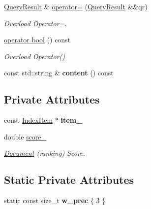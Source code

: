 \begin{DoxyCompactItemize}
\hyperlink{class_query_result}{Query\+Result} \& \hyperlink{class_query_result_a61fe09a36b729072cf8db7d36fbd57ba}{operator=} (\hyperlink{class_query_result}{Query\+Result} \&\&qr)
\begin{DoxyCompactList}\small\item\em Overload Operator=. \end{DoxyCompactList}\item 
\hyperlink{class_query_result_a7802d975b87856e0c213575258e0f4c0}{operator bool} () const
\begin{DoxyCompactList}\small\item\em Overload Operator() \end{DoxyCompactList}\item 
\mbox{\label{class_query_result_a043c7ad1c59640188e0e713fa548e560}} 
const std\+::string \& {\bfseries content} () const
\end{DoxyCompactItemize}
\subsection*{Private Attributes}
\begin{DoxyCompactItemize}
\item 
\mbox{\label{class_query_result_af34df0a7a6ae86b5eba712e3be297da3}} 
const \hyperlink{class_index_item}{Index\+Item} $\ast$ {\bfseries item\+\_\+}
\item 
\mbox{\label{class_query_result_abc28ed6816fe64438a1c4a9dcc3d802d}} 
double \hyperlink{class_query_result_abc28ed6816fe64438a1c4a9dcc3d802d}{score\+\_\+}
\begin{DoxyCompactList}\small\item\em \hyperlink{class_document}{Document} (ranking) Score. \end{DoxyCompactList}\end{DoxyCompactItemize}
\subsection*{Static Private Attributes}
\begin{DoxyCompactItemize}
\item 
\mbox{\label{class_query_result_aee8d99732fbc64cfb0c8fc5ff84baf99}} 
static const size\+\_\+t {\bfseries w\+\_\+prec} \{ 3 \}
\end{DoxyCompactItemize}
